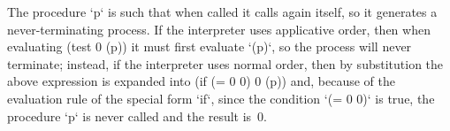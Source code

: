 The procedure `p` is such that when called it calls again itself, so it generates a never-terminating process.
If the interpreter uses applicative order, then when evaluating
\begtt\scm
(test 0 (p))
\endtt
it must first evaluate `(p)`, so the process will never terminate;  instead, if the interpreter uses normal order, then by substitution the above expression is expanded into
\begtt\scm
(if (= 0 0) 0 (p))
\endtt
and, because of the evaluation rule of the special form `if`, since the condition `(= 0 0)` is true, the procedure `p` is never called and the result is~$0$.
